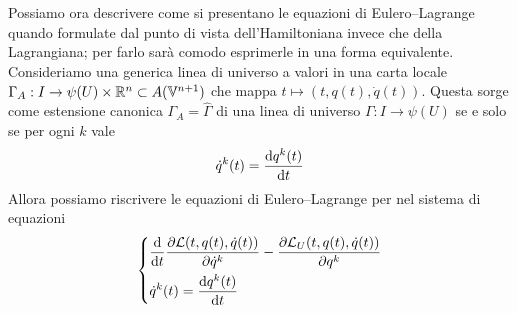 \documentclass[openany]{book}
\renewcommand\V{\mathbb{V}}
\begin{document}
Possiamo ora descrivere come si presentano le equazioni di Eulero--Lagrange quando formulate dal punto di vista dell'Hamiltoniana invece che della Lagrangiana; per farlo sarà comodo esprimerle in una forma equivalente.\\
Consideriamo una generica linea di universo a valori in una carta locale $\Gamma_A:I\to\psi(U)\times \R^n \subset A(\V^{n+1})$ che mappa $t\mapsto (t,q(t),\dot q(t))$. Questa sorge come estensione canonica $\Gamma_A = \hat\Gamma$ di una linea di universo $\Gamma:I\to\psi(U)$ se e solo se per ogni $k$ vale
\[ \dot q^k(t) = \frac{\text{d} q^k(t)}{\text{d} t} \]
Allora possiamo riscrivere le equazioni di Eulero--Lagrange per nel sistema di equazioni 
\[ \begin{dcases}
    \frac{\text{d} }{\text{d} t}\frac{\partial \mathcal{L}(t,q(t),\dot q(t))}{\partial \dot q^k} - \frac{\partial \mathcal{L}_U(t, q(t),\dot q(t))}{\partial q^k} \\ \dot q^k(t) = \frac{\text{d} q^k(t)}{\text{d} t}
\end{dcases} \]
\end{document}
